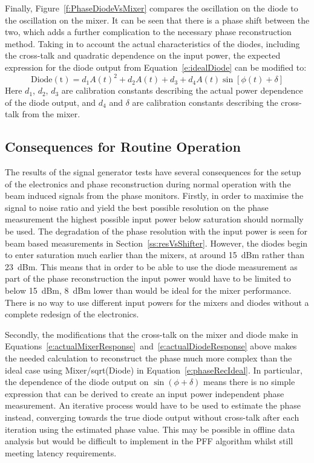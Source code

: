 Finally, Figure~\ref{f:PhaseDiodeVsMixer} compares the oscillation on the diode to the oscillation on the mixer. It can be seen that there is a phase shift between the two, which adds a further complication to the necessary phase reconstruction method. Taking in to account the actual characteristics of the diodes, including the cross-talk and quadratic dependence on the input power, the expected expression for the diode output from Equation~\ref{e:idealDiode} can be modified to:
\begin{equation}
\mathrm{Diode(t)} = d_1A(t)^2 + d_2A(t) + d_3 + d_4A(t)\sin[\phi(t)+\delta]
\label{e:actualDiodeResponse}
\end{equation}
Here \(d_1\), \(d_2\), \(d_3\) are calibration constants describing the actual power dependence of the diode output, and \(d_4\) and \(\delta\) are calibration constants describing the cross-talk from the mixer.



\subsection{Consequences for Routine Operation}
\label{ss:sigGenConsq}

The results of the signal generator tests have several consequences for the setup of the electronics and phase reconstruction during normal operation with the beam induced signals from the phase monitors. Firstly, in order to maximise the signal to noise ratio and yield the best possible resolution on the phase measurement the highest possible input power below saturation should normally be used. The degradation of the phase resolution with the input power is seen for beam based measurements in Section~\ref{ss:resVsShifter}. However, the diodes begin to enter saturation much earlier than the mixers, at around 15~dBm rather than 23~dBm. This means that in order to be able to use the diode measurement as part of the phase reconstruction the input power would have to be limited to below 15~dBm, 8~dBm lower than would be ideal for the mixer performance. There is no way to use different input powers for the mixers and diodes without a complete redesign of the electronics.

Secondly, the modifications that the cross-talk on the mixer and diode make in Equations~\ref{e:actualMixerResponse}~and~\ref{e:actualDiodeResponse} above makes the needed calculation to reconstruct the phase much more complex than the ideal case using Mixer/sqrt(Diode) in Equation~\ref{e:phaseRecIdeal}. In particular, the dependence of the diode output on \(\sin(\phi+\delta)\) means there is no simple expression that can be derived to create an input power independent phase measurement. An iterative process would have to be used to estimate the phase instead, converging towards the true diode output without cross-talk after each iteration using the estimated phase value. This may be possible in offline data analysis but would be difficult to implement in the PFF algorithm whilst still meeting latency requirements.

